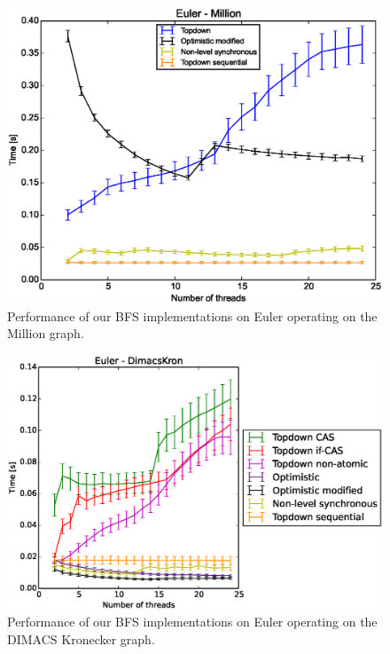 \documentclass[letterpaper]{article}
\begin{document}
		\begin{figure}[t]
			\centering
	  		\includegraphics[scale=0.33]{euler_million.eps}
	  		\vspace*{-0.3cm}
	  		\caption{Performance of our BFS implementations on Euler operating on the Million graph.\label{fig:eulerbig}}
		\end{figure}
		
		\begin{figure}[t]
			\centering
	  		\includegraphics[scale=0.33]{euler_dimacskron.eps}
	  		\vspace*{-0.3cm}
	  		\caption{Performance of our BFS implementations on Euler operating on the DIMACS Kronecker graph.\label{fig:eulerkron}}
		\end{figure}
\end{document}
